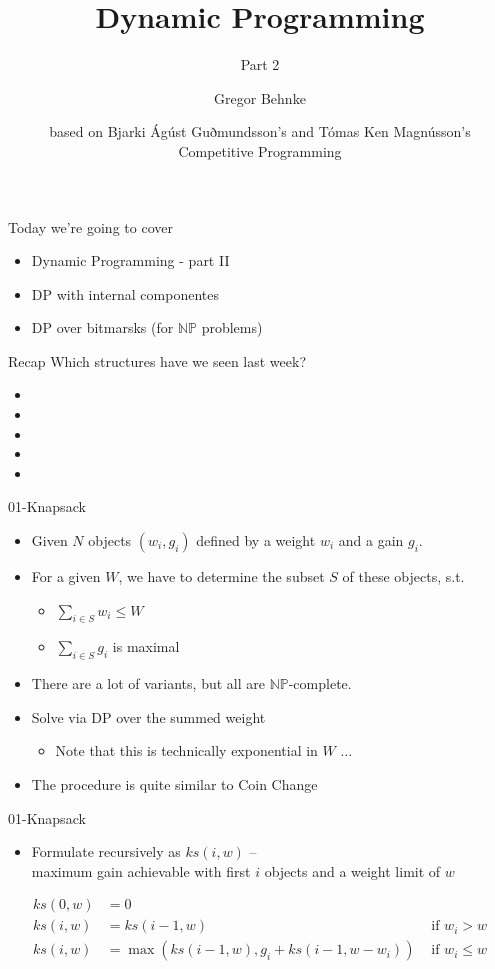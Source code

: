 \documentclass[12pt,t]{beamer}
\title{Dynamic Programming}
\subtitle{Part 2}
\author{Gregor Behnke}
\institute{Institute of Artificial Intelligence\\ Ulm University}
\date{\tiny based on Bjarki Ágúst Guðmundsson's and Tómas Ken Magnússon's\\Competitive Programming}
\newcommand{\bi}{\begin{itemize}}
\newcommand{\ei}{\end{itemize}}
\begin{document}
{
    \frame{
        \titlepage
    }
}


\begin{frame}{Today we're going to cover}
    \vspace{40pt}
    \bi
        \item Dynamic Programming \pause - part II
        \item DP with internal componentes
        \item DP over bitmarsks (for $\mathbb{NP}$ problems)
    \ei
\end{frame}


\begin{frame}{Recap}
    \vspace{40pt}
    Which structures have we seen last week?
    \bi
        \item 
        \item 
        \item 
        \item 
        \item 
    \ei
\end{frame}


\begin{frame}{01-Knapsack}
	\bi
		\item<1-> Given $N$ objects $(w_i,g_i)$ defined by a weight $w_i$ and a gain $g_i$.
		\item<2-> For a given $W$, we have to determine the subset $S$ of these objects, s.t.
		\bi
			\item $\sum_{i \in S} w_i \leq W$
			\item $\sum_{i \in S} g_i $ is maximal
		\ei
		\item<3-> There are a lot of variants, but all are $\mathbb{NP}$-complete.
		\vspace{40pt}
		\item<4-> Solve via DP over the summed weight
		\bi
			\item Note that this is technically exponential in $W$ $\dots$
		\ei
		\item<5-> The procedure is quite similar to Coin Change
	\ei
\end{frame}


\begin{frame}{01-Knapsack}
	\bi
		\item Formulate recursively as $ks(i,w)$ --\\
		maximum gain achievable with first $i$ objects and a weight limit of $w$
	\ei
	\begin{align*}
		ks(0,w) &= 0\\
		ks(i,w) &= ks(i-1,w) & \text{ if } w_i > w\\
		ks(i,w) &= \max (ks(i-1,w), g_i + ks(i-1,w-w_i)) & \text{ if } w_i \leq w
	\end{align*}
\end{frame}
\end{document}
